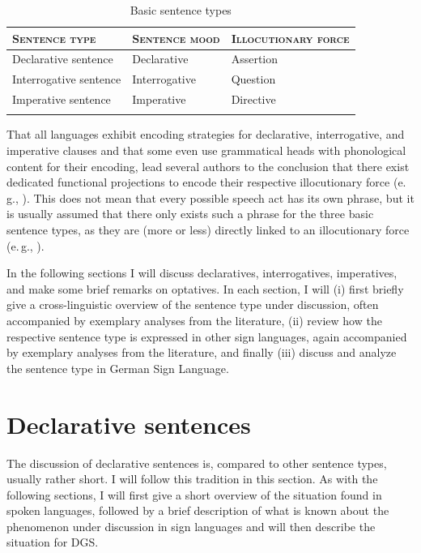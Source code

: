 \begin{table}[t]
\centering

\begin{tabular}{p{4cm}p{3.2cm}p{4cm}}
\lsptoprule
\textsc{Sentence type} & \textsc{Sentence mood} & \textsc{Illocutionary force} \\
\midrule
\rowcolor[gray]{.9}
Declarative sentence & Declarative & Assertion \\
Interrogative sentence & Interrogative & Question \\
\rowcolor[gray]{.9}
Imperative sentence & Imperative & Directive \\
\lspbottomrule
\end{tabular}
\caption{Basic sentence types}
\label{basicsentencetypes}
\end{table}

That all languages exhibit encoding strategies for declarative, interrogative, and imperative clauses and that some even use grammatical heads with phonological content for their encoding, lead several authors to the conclusion that there exist dedicated functional projections to encode their respective illocutionary force (e.\,g., \citealt{rizzi1997fine, cinque1999adverbs, ambar2003}). This does not mean that every possible speech act has its own phrase, but it is usually assumed that there only exists such a phrase for the three basic sentence types, as they are (more or less) directly linked to an illocutionary force (e.\,g., \citealt{speas2003configurational}).

In the following sections I will discuss declaratives, interrogatives, imperatives, and make some brief remarks on optatives. In each section, I will (i) first briefly give a cross-linguistic overview of the sentence type under discussion, often accompanied by exemplary analyses from the literature, (ii) review how the respective sentence type is expressed in other sign languages, again accompanied by exemplary analyses from the literature, and finally (iii) discuss and analyze the sentence type in German Sign Language.


\section{Declarative sentences}\label{declarativesentences}
The discussion of declarative sentences is, compared to other sentence types, usually rather short. I will follow this tradition in this section. As with the following sections, I will first give a short overview of the situation found in spoken languages, followed by a brief description of what is known about the phenomenon under discussion in sign languages and will then describe the situation for DGS. 


